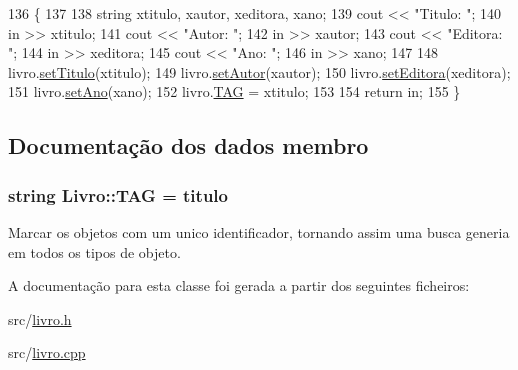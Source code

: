 \begin{DoxyCode}
136                                               \{
137     
138     \textcolor{keywordtype}{string} xtitulo, xautor, xeditora, xano;
139     cout << \textcolor{stringliteral}{"Titulo: "};
140     in >> xtitulo;
141     cout << \textcolor{stringliteral}{"Autor: "};
142     in >> xautor;
143     cout << \textcolor{stringliteral}{"Editora: "};
144     in >> xeditora;
145     cout << \textcolor{stringliteral}{"Ano: "};
146     in >> xano;
147 
148     livro.\hyperlink{class_livro_adbae26ce6938e1f56ed6d88b458351c7}{setTitulo}(xtitulo);
149     livro.\hyperlink{class_livro_ab6979584fef48cc9b2ca4dc0359dd69d}{setAutor}(xautor);
150     livro.\hyperlink{class_livro_a872239a75a304f78e8b06fd3a5cb7b32}{setEditora}(xeditora);
151     livro.\hyperlink{class_livro_a7a5d33fab8e1035fe0b3a20ab398cf54}{setAno}(xano);
152     livro.\hyperlink{class_livro_aaa48373327454aabb96ba8d7f5835963}{TAG} = xtitulo;
153 
154     \textcolor{keywordflow}{return} in;
155 \}
\end{DoxyCode}


\subsection{Documentação dos dados membro}
\subsubsection[{\texorpdfstring{T\+AG}{TAG}}]{\setlength{\rightskip}{0pt plus 5cm}string Livro\+::\+T\+AG = titulo}\hypertarget{class_livro_aaa48373327454aabb96ba8d7f5835963}{}\label{class_livro_aaa48373327454aabb96ba8d7f5835963}


Marcar os objetos com um unico identificador, tornando assim uma busca generia em todos os tipos de objeto. 



A documentação para esta classe foi gerada a partir dos seguintes ficheiros\+:\begin{DoxyCompactItemize}
\item 
src/\hyperlink{livro_8h}{livro.\+h}\item 
src/\hyperlink{livro_8cpp}{livro.\+cpp}\end{DoxyCompactItemize}
